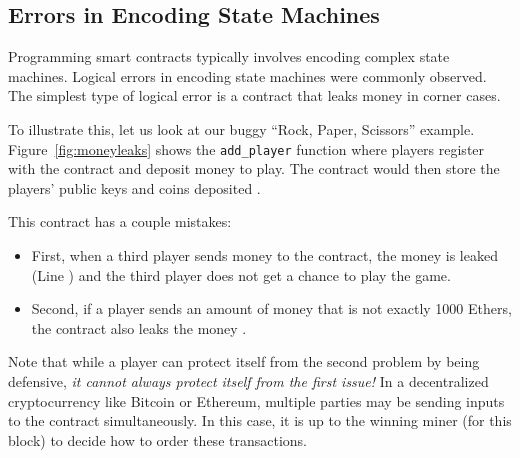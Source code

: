\documentclass[10pt,twocolumn,letterpaper]{article}
\newcommand{\elaine}[1]{{\color{red}{[elaine: #1]}}}
\newcommand{\ignore}[1]{}
\begin{document}
\elaine{emphasize this in the intro too.}


\ignore{
In this section, we'll explore the security and incentive alignment pitfalls in designing a smart contract. We'll use an easy-to-understand application as a running example, based on a Rock-Paper-Scissors game. We then analyze a plausible (but subtly buggy) initial implementation, pointing out its flaws. Mistakes resembling these were actually observed in our Smart Contract Programming Lab in ``CMSC 414 - Undergraduate Security''. vThis section is centered around the exercises. We provide hints to guide the reader towards discovering how to improve on them. Our ``reference'' solution can be found in the accompanying materials.
}


\subsection{Errors in Encoding State Machines}

Programming smart contracts typically involves
encoding complex state machines.
Logical errors
in encoding state machines were commonly observed.
The simplest type of logical error is a contract
that leaks money in corner cases.


To illustrate this, let us look at our buggy
``Rock, Paper, Scissors'' example.
Figure~\ref{fig:moneyleaks}
shows the {\tt add\_player} function
where players register with the contract and  
deposit money to play.
The contract would then store the players'
public keys 
and coins deposited \elaine{refer to line numbers}.

This contract has a couple mistakes:
\begin{itemize}[leftmargin=5mm]
\item
First, when a third player sends money to the contract,
the money is leaked (Line \elaine{refer}) 
and the third player does not get a chance
to play the game.
\item
Second, if a player sends an amount of money that is not
exactly 1000 Ethers, \elaine{make sure those names come out in the background section.}
the contract also leaks the money \elaine{refer to line number}.
\end{itemize}

Note that while a player 
can protect itself from the second problem by being defensive, 
{\it it cannot always protect 
itself from the first issue!}
In a decentralized cryptocurrency
like Bitcoin or Ethereum, 
multiple parties may be sending inputs 
to the contract simultaneously.
In this case, it is up to the winning miner
(for this block) to decide how to order these transactions.
\end{document}
